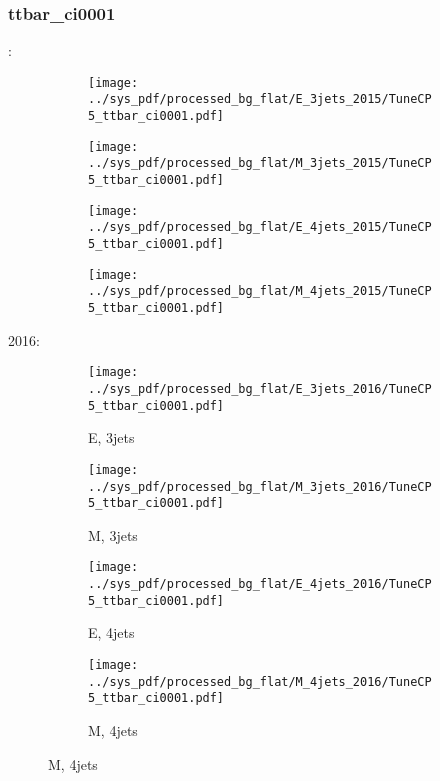 \documentclass{beamer}
\begin{document}
\begin{frame}
\frametitle{ttbar_ci0001}
\fontsize{5}{1}:
\begin{figure}
\centering
\begin{subfigure}[b]{0.24\textwidth}
\texttt{[image: ../sys\_pdf/processed\_bg\_flat/E\_3jets\_2015/TuneCP5\_ttbar\_ci0001.pdf]}
\end{subfigure}
\begin{subfigure}[b]{0.24\textwidth}
\texttt{[image: ../sys\_pdf/processed\_bg\_flat/M\_3jets\_2015/TuneCP5\_ttbar\_ci0001.pdf]}
\end{subfigure}
\begin{subfigure}[b]{0.24\textwidth}
\texttt{[image: ../sys\_pdf/processed\_bg\_flat/E\_4jets\_2015/TuneCP5\_ttbar\_ci0001.pdf]}
\end{subfigure}
\begin{subfigure}[b]{0.24\textwidth}
\texttt{[image: ../sys\_pdf/processed\_bg\_flat/M\_4jets\_2015/TuneCP5\_ttbar\_ci0001.pdf]}
\end{subfigure}
\end{figure}
2016:
\begin{figure}
\centering
\begin{subfigure}[b]{0.24\textwidth}
\texttt{[image: ../sys\_pdf/processed\_bg\_flat/E\_3jets\_2016/TuneCP5\_ttbar\_ci0001.pdf]}
\captionsetup{font=tiny}
\caption{E, 3jets}
\end{subfigure}
\begin{subfigure}[b]{0.24\textwidth}
\texttt{[image: ../sys\_pdf/processed\_bg\_flat/M\_3jets\_2016/TuneCP5\_ttbar\_ci0001.pdf]}
\captionsetup{font=tiny}
\caption{M, 3jets}
\end{subfigure}
\begin{subfigure}[b]{0.24\textwidth}
\texttt{[image: ../sys\_pdf/processed\_bg\_flat/E\_4jets\_2016/TuneCP5\_ttbar\_ci0001.pdf]}
\captionsetup{font=tiny}
\caption{E, 4jets}
\end{subfigure}
\begin{subfigure}[b]{0.24\textwidth}
\texttt{[image: ../sys\_pdf/processed\_bg\_flat/M\_4jets\_2016/TuneCP5\_ttbar\_ci0001.pdf]}
\captionsetup{font=tiny}
\caption{M, 4jets}
\end{subfigure}
\end{figure}
\end{frame}
\end{document}
